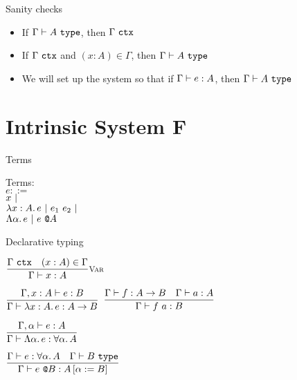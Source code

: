 \documentclass{beamer}
\begin{document}
\begin{frame}{Sanity checks}

\begin{itemize}
  \item If $\type{A}$, then $\tyctx{\Gamma}$
  \item If $\tyctx{\Gamma}$ and $(x : A) \in \Gamma$, then $\type{A}$
  \item We will set up the system so that if $\typing{e}{A}$, then $\type{A}$
\end{itemize}

\end{frame}

\section{Intrinsic System F}

\begin{frame}{Terms}

Terms: \\
$e ::=$ \\
\qquad $x \pipe $ \\
\qquad $\ifun{x}{A}{e} \pipe \app{e_1}{e_2} \pipe$ \\
\qquad $\tfun{\alpha}{e} \pipe \tapp{e}{A}$

\end{frame}

\begin{frame}{Declarative typing}

\begin{center}
  $\infrule[Var]{\tyctx{\Gamma} \quad \sidecond{(x : A) \in \Gamma}}{\typing{x}{A}}$

  \vspace{2em}

  $\infrule{\fulltyping{\extend{\Gamma}{x}{A}}{e}{B}}{\typing{\ifun{x}{A}{e}}{\Fun{A}{B}}}$ \quad
  $\infrule{\typing{f}{\Fun{A}{B}} \quad \typing{a}{A}}{\typing{\app{f}{a}}{B}}$

  \vspace{2em}

  $\infrule{\fulltyping{\extendtype{\Gamma}{\alpha}}{e}{A}}{\typing{\tfun{\alpha}{e}}{\ForallT{\alpha}{A}}}$

  \vspace{2em}

  $\infrule{\typing{e}{\ForallT{\alpha}{A}} \quad \type{B}}{\typing{\tapp{e}{B}}{\subst{A}{\alpha}{B}}}$
\end{center}

\end{frame}
\end{document}
